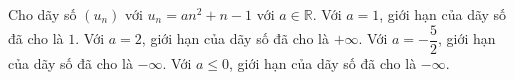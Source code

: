 \begin{ex}
Cho dãy số $(u_n)$ với $u_n=an^2+n-1$ với $a\in\mathbb R$.
\choiceTF
{Với $a=1$, giới hạn của dãy số đã cho là $1$.}
{\True Với $a=2$, giới hạn của dãy số đã cho là $+\infty$.}
{\True Với $a=-\dfrac52$, giới hạn của dãy số đã cho là $-\infty$.}
{Với $a\le0$, giới hạn của dãy số đã cho là $-\infty$.}
\end{ex}
